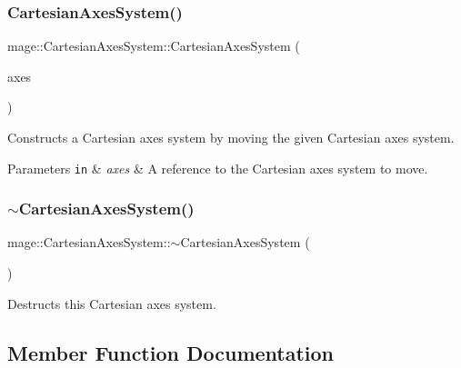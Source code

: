 \subsubsection{\texorpdfstring{Cartesian\+Axes\+System()}{CartesianAxesSystem()}\hspace{0.1cm}{\footnotesize\ttfamily [6/6]}}
{\footnotesize\ttfamily mage\+::\+Cartesian\+Axes\+System\+::\+Cartesian\+Axes\+System (\begin{DoxyParamCaption}\item[{\hyperlink{structmage_1_1_cartesian_axes_system}{Cartesian\+Axes\+System} \&\&}]{axes }\end{DoxyParamCaption})\hspace{0.3cm}{\ttfamily [default]}}

Constructs a Cartesian axes system by moving the given Cartesian axes system.


\begin{DoxyParams}[1]{Parameters}
\mbox{\tt in}  & {\em axes} & A reference to the Cartesian axes system to move. \\
\hline
\end{DoxyParams}
\hypertarget{structmage_1_1_cartesian_axes_system_a8c32f25e03757c03506d9a93bddf5d13}{}\label{structmage_1_1_cartesian_axes_system_a8c32f25e03757c03506d9a93bddf5d13} 
\subsubsection{\texorpdfstring{$\sim$\+Cartesian\+Axes\+System()}{~CartesianAxesSystem()}}
{\footnotesize\ttfamily mage\+::\+Cartesian\+Axes\+System\+::$\sim$\+Cartesian\+Axes\+System (\begin{DoxyParamCaption}{ }\end{DoxyParamCaption})\hspace{0.3cm}{\ttfamily [default]}}

Destructs this Cartesian axes system. 

\subsection{Member Function Documentation}
\hypertarget{structmage_1_1_cartesian_axes_system_af354a35914450f7f8c2d649d70bb4033}{}\label{structmage_1_1_cartesian_axes_system_af354a35914450f7f8c2d649d70bb4033} 
